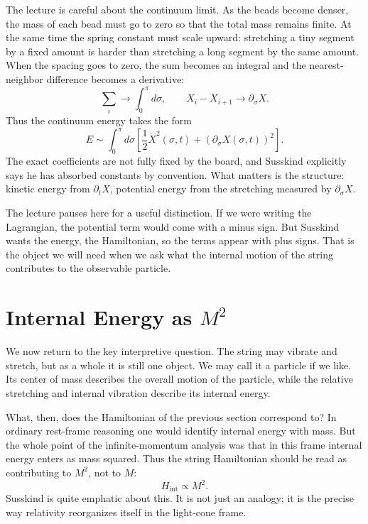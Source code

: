 The lecture is careful about the continuum limit. As the beads become denser, the mass of each bead must go to zero so that the total mass remains finite. At the same time the spring constant must scale upward: stretching a tiny segment by a fixed amount is harder than stretching a long segment by the same amount. When the spacing goes to zero, the sum becomes an integral and the nearest-neighbor difference becomes a derivative:
\begin{equation}
\sum_i \longrightarrow \int_0^\pi d\sigma,
\qquad
X_i-X_{i+1}\longrightarrow \partial_\sigma X.
\end{equation}
Thus the continuum energy takes the form
\begin{equation}
E \sim \int_0^\pi d\sigma
\left[
\frac{1}{2}\dot X^2(\sigma,t)
+
\left(\partial_\sigma X(\sigma,t)\right)^2
\right].
\end{equation}
The exact coefficients are not fully fixed by the board, and Susskind explicitly says he has absorbed constants by convention. What matters is the structure: kinetic energy from \(\partial_t X\), potential energy from the stretching measured by \(\partial_\sigma X\).

The lecture pauses here for a useful distinction. If we were writing the Lagrangian, the potential term would come with a minus sign. But Susskind wants the energy, the Hamiltonian, so the terms appear with plus signs. That is the object we will need when we ask what the internal motion of the string contributes to the observable particle.

\section{Internal Energy as \(M^2\)}

We now return to the key interpretive question. The string may vibrate and stretch, but as a whole it is still one object. We may call it a particle if we like. Its center of mass describes the overall motion of the particle, while the relative stretching and internal vibration describe its internal energy.

What, then, does the Hamiltonian of the previous section correspond to? In ordinary rest-frame reasoning one would identify internal energy with mass. But the whole point of the infinite-momentum analysis was that in this frame internal energy enters as mass squared. Thus the string Hamiltonian should be read as contributing to \(M^2\), not to \(M\):
\begin{equation}
H_{\mathrm{int}} \propto M^2.
\end{equation}
Susskind is quite emphatic about this. It is not just an analogy; it is the precise way relativity reorganizes itself in the light-cone frame.

